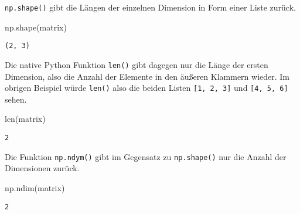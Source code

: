 \documentclass[
  letterpaper,
  DIV=11,
  numbers=noendperiod]{scrreprt}
\newenvironment{Shaded}{\begin{snugshade}}{\end{snugshade}}
\newcommand{\BuiltInTok}[1]{\textcolor[rgb]{0.00,0.23,0.31}{#1}}
\newcommand{\NormalTok}[1]{\textcolor[rgb]{0.00,0.23,0.31}{#1}}
\begin{document}
\begin{tcolorbox}
\texttt{np.shape()} gibt die Längen der einzelnen Dimension in Form
einer Liste zurück.

\begin{Shaded}
\begin{Highlighting}[]
\NormalTok{np.shape(matrix)}
\end{Highlighting}
\end{Shaded}

\begin{verbatim}
(2, 3)
\end{verbatim}

Die native Python Funktion \texttt{len()} gibt dagegen nur die Länge der
ersten Dimension, also die Anzahl der Elemente in den äußeren Klammern
wieder. Im obrigen Beispiel würde \texttt{len()} also die beiden Listen
\texttt{{[}1,\ 2,\ 3{]}} und \texttt{{[}4,\ 5,\ 6{]}} sehen.

\begin{Shaded}
\begin{Highlighting}[]
\BuiltInTok{len}\NormalTok{(matrix)}
\end{Highlighting}
\end{Shaded}

\begin{verbatim}
2
\end{verbatim}

Die Funktion \texttt{np.ndym()} gibt im Gegensatz zu \texttt{np.shape()}
nur die Anzahl der Dimensionen zurück.

\begin{Shaded}
\begin{Highlighting}[]
\NormalTok{np.ndim(matrix)}
\end{Highlighting}
\end{Shaded}

\begin{verbatim}
2
\end{verbatim}

\begin{tcolorbox}[enhanced jigsaw, breakable, opacityback=0, left=2mm, coltitle=black, leftrule=.75mm, colframe=quarto-callout-tip-color-frame, opacitybacktitle=0.6, toprule=.15mm, bottomtitle=1mm, titlerule=0mm, toptitle=1mm, title=\textcolor{quarto-callout-tip-color}{\faLightbulb}\hspace{0.5em}{Die Ausgabe von \texttt{np.ndim()} kann mit \texttt{np.shape()}und einer
nativen Python Funktion erreicht werden. Wie?}, colbacktitle=quarto-callout-tip-color!10!white, arc=.35mm, bottomrule=.15mm, rightrule=.15mm, colback=white]


\end{tcolorbox}
\end{tcolorbox}
\end{document}
